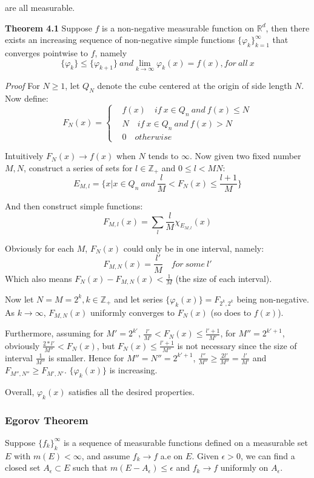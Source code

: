 \documentclass[
]{article}
\begin{document}
are all measurable.

\vspace{2mm}
\textbf{Theorem 4.1}
Suppose \(f\) is a non-negative measurable function on \(\mathbb{R}^d\),
then there exists an increasing sequence of non-negative simple functions
\(\{\varphi_k\}^{\infty}_{k=1}\) that converges pointwise to \(f\), namely
\[\{\varphi_k\}\leq \{\varphi_{k+1}\}\ and \lim_{k\to \infty}\varphi_k(x)=f(x), for\ all\ x\]

\textit{Proof}
For \(N\geq 1\), let \(Q_N\) denote the cube centered at the origin of side length
\(N\). Now define:
\begin{equation}
F_N(x)=
\left\{\begin{aligned}
  & f(x) \quad if\ x \in Q_n\ and\ f(x) \leq N \\ 
  & N \quad if\ x \in Q_n\ and\ f(x) > N \\
  & 0 \quad otherwise
\end{aligned}\right.
\end{equation}

Intuitively \(F_N(x)\to f(x)\) when \(N\) tends to \(\infty\). Now given two fixed number \(M, N\), construct a series of sets for \(l \in \mathbb{Z_+}\) and
\(0 \leq l < MN\):
\[
  E_{M, l} = \{x | x \in Q_n\ and\ \frac{l}{M} < F_N(x) \leq \frac{l+1}{M} \}
\]

And then construct simple functions:
\[
  F_{M, l}(x)=\sum_{l}\frac{l}{M}\chi_{E_{M, l}}(x)
\]

Obviously for each \(M\), \(F_N(x)\) could only be in one interval, namely:
\[
  F_{M, N}(x)=\frac{l'}{M}\quad for\ some\ l'
\]
Which also means \(F_N(x) - F_{M, N}(x) < \frac{1}{M}\) (the size of each interval).

Now let \(N = M = 2^k, k\in\mathbb{Z_+}\) and let series
\(\{\varphi_k(x)\}=F_{2^k, 2^k}\) being non-negative.
As \(k\to \infty\), \(F_{M, N}(x)\) uniformly converges to \(F_N(x)\)
(so does to \(f(x)\)).

Furthermore, assuming for \(M'=2^{k'}\), \(\frac{l'}{M'}<F_N(x)\leq\frac{l'+1}{M'}\),
for \(M''=2^{k'+1}\), obviously \(\frac{2*l'}{M''}<F_N(x)\), but \(F_N(x)\leq \frac{l'+1}{M''}\)
is not necessary since the size of interval \(\frac{1}{M''}\) is smaller. Hence
for \(M''=N''=2^{k'+1}\), \(\frac{l''}{M''}\geq \frac{2l'}{M''}=\frac{l'}{M'}\) and
\(F_{M'', N''}\geq F_{M', N'}\). \(\{\varphi_k(x)\}\) is increasing.

Overall, \(\varphi_k(x)\) satisfies all the desired properties.

\subsubsection{Egorov Theorem}
Suppose \(\{f_k\}_k^{\infty}\) is a sequence of measurable functions defined on a
measurable set \(E\) with \(m(E)<\infty\), and assume \(f_k \to f \) a.e on \(E\).
Given \(\epsilon > 0\), we can find a closed set \(A_{\epsilon}\subset E\) such that
\(m(E-A_{\epsilon})\leq \epsilon\) and \(f_k\to f\) uniformly on \(A_{\epsilon}\).
\end{document}
